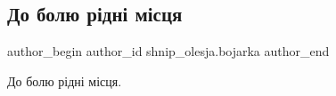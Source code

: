  
 
 
 
 

\subsection{До болю рідні місця}
\label{sec:17_01_2023.fb.shnip_olesja.bojarka.1.do_bolyu_r_dn__m_sts}

\ifcmt
 author_begin
   author_id shnip_olesja.bojarka
 author_end
\fi

До болю рідні місця.
